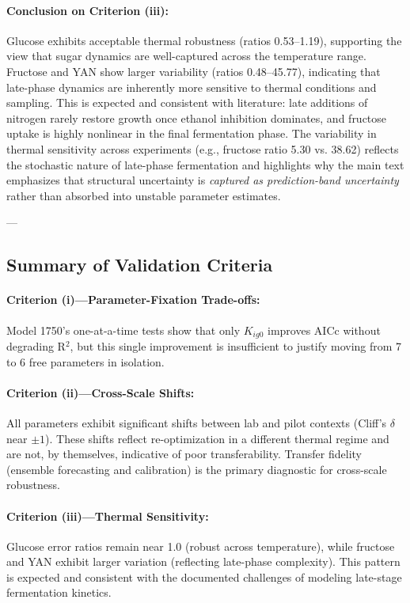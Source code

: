 \paragraph{Conclusion on Criterion (iii):}
Glucose exhibits acceptable thermal robustness (ratios 0.53--1.19), supporting the view 
that sugar dynamics are well-captured across the temperature range. Fructose and YAN show 
larger variability (ratios 0.48--45.77), indicating that late-phase dynamics are inherently 
more sensitive to thermal conditions and sampling. This is expected and consistent with 
literature: late additions of nitrogen rarely restore growth once ethanol inhibition 
dominates, and fructose uptake is highly nonlinear in the final fermentation phase. 
The variability in thermal sensitivity across experiments (e.g., fructose ratio 5.30 vs. 
38.62) reflects the stochastic nature of late-phase fermentation and highlights why the 
main text emphasizes that structural uncertainty is \emph{captured as prediction-band 
uncertainty} rather than absorbed into unstable parameter estimates.

---

\subsection{Summary of Validation Criteria}

\paragraph{Criterion (i)—Parameter-Fixation Trade-offs:}
Model 1750's one-at-a-time tests show that only $K_{ig0}$ improves AICc without degrading R$^2$, 
but this single improvement is insufficient to justify moving from 7 to 6 free parameters in isolation.

\paragraph{Criterion (ii)—Cross-Scale Shifts:}
All parameters exhibit significant shifts between lab and pilot contexts (Cliff's $\delta$ near $\pm 1$). 
These shifts reflect re-optimization in a different thermal regime and are not, by themselves, 
indicative of poor transferability. Transfer fidelity (ensemble forecasting and calibration) 
is the primary diagnostic for cross-scale robustness.

\paragraph{Criterion (iii)—Thermal Sensitivity:}
Glucose error ratios remain near 1.0 (robust across temperature), while fructose and YAN 
exhibit larger variation (reflecting late-phase complexity). This pattern is expected and 
consistent with the documented challenges of modeling late-stage fermentation kinetics.

